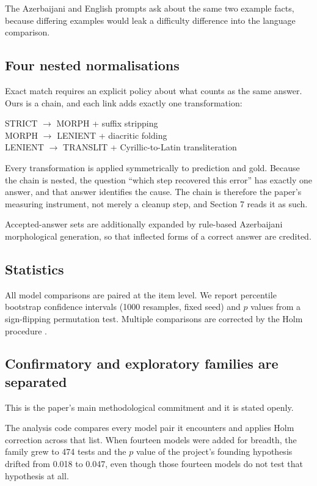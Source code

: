 \documentclass[final]{clv2025}
\begin{document}
The Azerbaijani and English prompts ask about the same two example facts,
because differing examples would leak a difficulty difference into the language
comparison.

\subsection{Four nested normalisations}

Exact match requires an explicit policy about what counts as the same answer.
Ours is a chain, and each link adds exactly one transformation:

\begin{displaytext}
STRICT $\rightarrow$ MORPH \quad + suffix stripping\\
MORPH $\rightarrow$ LENIENT \quad + diacritic folding\\
LENIENT $\rightarrow$ TRANSLIT \quad + Cyrillic-to-Latin transliteration
\end{displaytext}

Every transformation is applied symmetrically to prediction and gold. Because
the chain is nested, the question ``which step recovered this error'' has
exactly one answer, and that answer identifies the cause. The chain is
therefore the paper's measuring instrument, not merely a cleanup step, and
Section 7 reads it as such.

Accepted-answer sets are additionally expanded by rule-based Azerbaijani
morphological generation, so that inflected forms of a correct answer are
credited.

\subsection{Statistics}

All model comparisons are paired at the item level. We report percentile
bootstrap confidence intervals (1000 resamples, fixed seed) and $p$ values from
a sign-flipping permutation test. Multiple comparisons are corrected by the
Holm procedure \cite{holm1979simple}.

\subsection{Confirmatory and exploratory families are separated}

This is the paper's main methodological commitment and it is stated openly.

The analysis code compares every model pair it encounters and applies Holm
correction across that list. When fourteen models were added for breadth, the
family grew to 474 tests and the $p$ value of the project's founding hypothesis
drifted from 0.018 to 0.047, even though those fourteen models do not test that
hypothesis at all.
\end{document}
